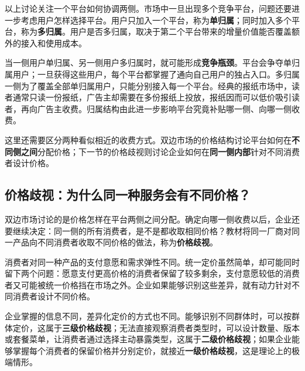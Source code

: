 以上讨论关注一个平台如何协调两侧。市场中一旦出现多个竞争平台，问题还要进一步考虑用户怎样选择平台。用户只加入一个平台，称为\textbf{单归属}；同时加入多个平台，称为\textbf{多归属}。用户是否多归属，取决于第二个平台带来的增量价值能否覆盖额外的接入和使用成本。

当一侧用户单归属、另一侧用户多归属时，就可能形成\textbf{竞争瓶颈}。平台会争夺单归属用户；一旦获得这些用户，每个平台都掌握了通向自己用户的独占入口。多归属一侧为了覆盖全部单归属用户，只能分别接入每一个平台。经典的报纸市场中，读者通常只读一份报纸，广告主却需要在多份报纸上投放，报纸因而可以低价吸引读者，再向广告主收费。归属结构由此进一步影响平台究竟补贴哪一侧、向哪一侧收费。

这里还需要区分两种看似相近的收费方式。双边市场的价格结构讨论平台如何在\textbf{不同侧之间}分配价格；下一节的价格歧视则讨论企业如何在\textbf{同一侧内部}针对不同消费者设计价格。

\begin{center}
\end{center}

\subsection{价格歧视：为什么同一种服务会有不同价格？}

双边市场讨论的是价格怎样在平台两侧之间分配。确定向哪一侧收费以后，企业还要继续决定：同一侧的所有消费者，是不是都收取相同价格？教材将同一厂商对同一产品向不同消费者收取不同价格的做法，称为\textbf{价格歧视}。

消费者对同一种产品的支付意愿和需求弹性不同。统一定价虽然简单，却可能同时留下两个问题：愿意支付更高价格的消费者保留了较多剩余，支付意愿较低的消费者又可能被统一价格挡在市场之外。企业如果能够识别这些差异，就有动力针对不同消费者设计不同价格。

企业掌握的信息不同，差异化定价的方式也不同。能够识别不同群体时，可以按群体定价，这属于\textbf{三级价格歧视}；无法直接观察消费者类型时，可以设计数量、版本或套餐菜单，让消费者通过选择主动暴露类型，这属于\textbf{二级价格歧视}；如果企业能够掌握每个消费者的保留价格并分别定价，就接近\textbf{一级价格歧视}，这是理论上的极端情形。

